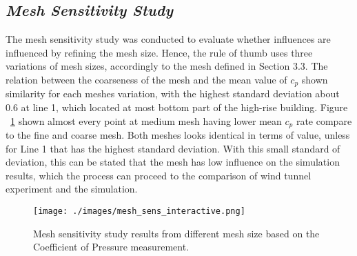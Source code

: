 \documentclass[12pt,a4paper]{cibb}
\begin{document}
\subsection{\bf \it Mesh Sensitivity Study}
The mesh sensitivity study was conducted to evaluate whether influences are influenced by refining the mesh size. Hence, the rule of thumb uses three variations of mesh sizes, accordingly to the mesh defined in Section 3.3. The relation between the coarseness of the mesh and the mean value of $c_p$ shown similarity for each meshes variation, with the highest standard deviation about 0.6 at line 1, which located at most bottom part of the high-rise building. Figure ~\ref{fig:meshsensitivity} shown almost every point at medium mesh having lower mean $c_p$ rate compare to the fine and coarse mesh. Both meshes looks identical in terms of value, unless for Line 1 that has the highest standard deviation. With this small standard of deviation, this can be stated that the mesh has low influence on the simulation results, which the process can proceed to the comparison of wind tunnel experiment and the simulation.


\begin{figure}[h]
\vspace{1mm}
 \begin{center}
\texttt{[image: ./images/mesh\_sens\_interactive.png]}
\caption{
Mesh sensitivity study results from different mesh size based on the Coefficient of Pressure measurement.}
\label{fig:meshsensitivity}
\vspace{-10mm}
\end{center}
\end{figure}
\end{document}
